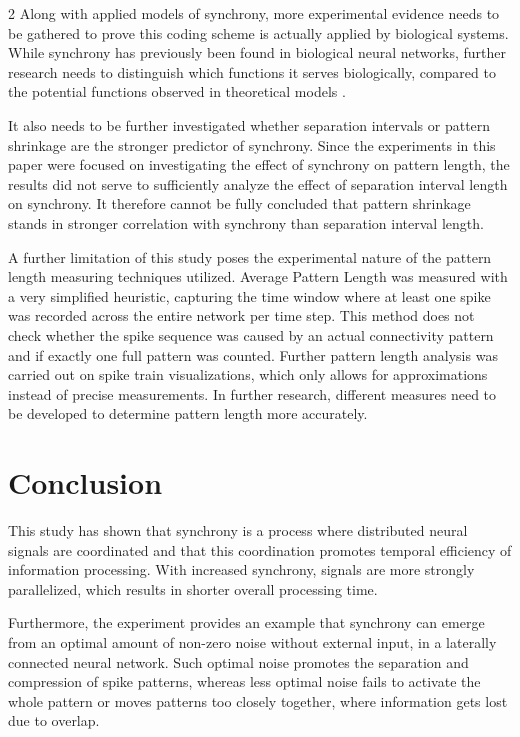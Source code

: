 \documentclass[12pt,a4paper]{article}
\begin{document}
\begin{multicols}{2}
            Along with applied models of synchrony, more experimental evidence needs to be gathered to prove this coding scheme is actually applied by biological systems. While synchrony has previously been found in biological neural networks, further research needs to distinguish which functions it serves biologically, compared to the potential functions observed in theoretical models \cite{L, M}.
            
            It also needs to be further investigated whether separation intervals or pattern shrinkage are the stronger predictor of synchrony. Since the experiments in this paper were focused on investigating the effect of synchrony on pattern length, the results did not serve to sufficiently analyze the effect of separation interval length on synchrony. It therefore cannot be fully concluded that pattern shrinkage stands in stronger correlation with synchrony than separation interval length.
            
            A further limitation of this study poses the experimental nature of the pattern length measuring techniques utilized. Average Pattern Length was measured with a very simplified heuristic, capturing the time window where at least one spike was recorded across the entire network per time step. This method does not check whether the spike sequence was caused by an actual connectivity pattern and if exactly one full pattern was counted. Further pattern length analysis was carried out on spike train visualizations, which only allows for approximations instead of precise measurements. In further research, different measures need to be developed to determine pattern length more accurately.
            
        \section{Conclusion}
            This study has shown that synchrony is a process where distributed neural signals are coordinated and that this coordination promotes temporal efficiency of information processing. With increased synchrony, signals are more strongly parallelized, which results in shorter overall processing time.
            
            Furthermore, the experiment provides an example that synchrony can emerge from an optimal amount of non-zero noise without external input, in a laterally connected neural network. Such optimal noise promotes the separation and compression of spike patterns, whereas less optimal noise fails to activate the whole pattern or moves patterns too closely together, where information gets lost due to overlap.
            

\end{multicols}
\end{document}
